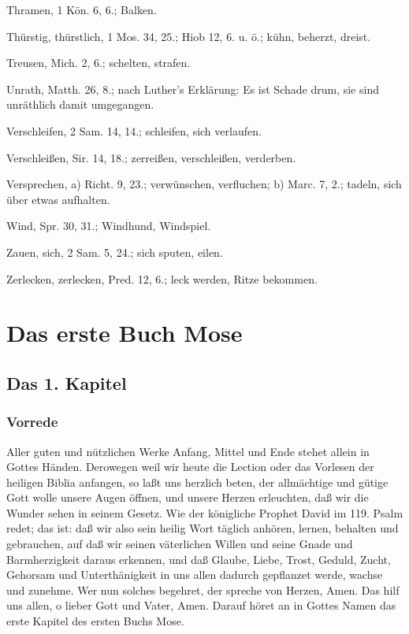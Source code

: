 Thramen, 1 Kön. 6, 6.; Balken.

Thürstig, thürstlich, 1 Mos. 34, 25.; Hiob 12, 6. u. ö.; kühn, beherzt, dreist.

Treusen, Mich. 2, 6.; schelten, strafen.

Unrath, Matth. 26, 8.; nach Luther's Erklärung: Es ist Schade drum, sie sind unräthlich damit umgegangen.

Verschleifen, 2 Sam. 14, 14.; schleifen, sich verlaufen.

Verschleißen, Sir. 14, 18.; zerreißen, verschleißen, verderben.

Versprechen, a) Richt. 9, 23.; verwünschen, verfluchen; b) Marc. 7, 2.; tadeln, sich über etwas aufhalten.

Wind, Spr. 30, 31.; Windhund, Windspiel.

Zauen, sich, 2 Sam. 5, 24.; sich sputen, eilen.

Zerlecken, zerlecken, Pred. 12, 6.; leck werden, Ritze bekommen.
\part{Das erste Buch Mose}

\chapter{Das 1. Kapitel}

\section{Vorrede}


Aller guten und nützlichen Werke Anfang, Mittel und Ende stehet allein in Gottes Händen. Derowegen weil wir heute die Lection oder das Vorlesen der heiligen Biblia anfangen, so laßt uns herzlich beten, der allmächtige und gütige Gott wolle unsere Augen öffnen, und unsere Herzen erleuchten, daß wir die Wunder sehen in seinem Gesetz. Wie der königliche Prophet David im 119. Psalm redet; das ist: daß wir also sein heilig Wort täglich anhören, lernen, behalten und gebrauchen, auf daß wir seinen väterlichen Willen und seine Gnade und Barmherzigkeit daraus erkennen, und daß Glaube, Liebe, Trost, Geduld, Zucht, Gehorsam und Unterthänigkeit in uns allen dadurch gepflanzet werde, wachse und zunehme. Wer nun solches begehret, der spreche von Herzen, Amen. Das hilf uns allen, o lieber Gott und Vater, Amen. Darauf höret an in Gottes Namen das erste Kapitel des ersten Buchs Mose.

